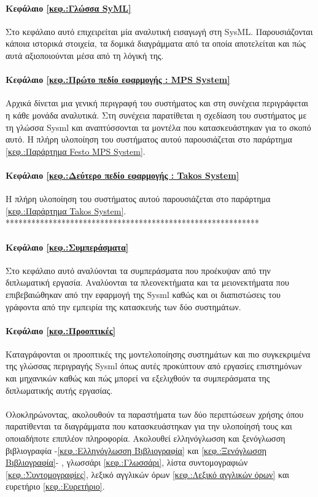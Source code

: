 \documentclass[a4paper,12pt,twoside]{report}
\begin{document}
		\paragraph{Κεφάλαιο \ref{κεφ.:Γλώσσα SyML}} {Στο κεφάλαιο αυτό επιχειρείται μία αναλυτική εισαγωγή στη SysML. Παρουσιάζονται κάποια ιστορικά στοιχεία, τα δομικά διαγράμματα από τα οποία αποτελείται και πώς αυτά αξιοποιούνται μέσα από τη λόγική της.
		}
		\paragraph{Κεφάλαιο \ref{κεφ.:Πρώτο πεδίο εφαρμογής : MPS System}} {Αρχικά δίνεται μια γενική περιγραφή του συστήματος και στη συνέχεια περιγράφεται η κάθε μονάδα αναλυτικά. Στη συνέχεια παρατίθεται η σχεδίαση του συστήματος με τη γλώσσα Sysml και αναπτύσσονται τα μοντέλα που κατασκευάστηκαν για το σκοπό αυτό. Η πλήρη υλοποίηση του συστήματος αυτού παρουσιάζεται στο παράρτημα \ref{κεφ.:Παράρτημα Festo MPS System}.
		}
		\paragraph{Κεφάλαιο \ref{κεφ.:Δεύτερο πεδίο εφαρμογής : Takos System}} {Η πλήρη υλοποίηση του συστήματος αυτού παρουσιάζεται στο παράρτημα \ref{κεφ.:Παράρτημα Takos System}.
		***********************************************************
		}
		\paragraph{Κεφάλαιο \ref{κεφ.:Συμπεράσματα}} {Στο κεφάλαιο αυτό αναλύονται τα συμπεράσματα που προέκυψαν από την διπλωματική εργασία. Αναλύονται τα πλεονεκτήματα και τα μειονεκτήματα που επιβεβαιώθηκαν από την εφαρμογή της Sysml καθώς και οι διαπιστώσεις του γράφοντα από την εμπειρία της κατασκευής των δύο συστημάτων.
		}
		\paragraph{Κεφάλαιο \ref{κεφ.:Προοπτικές}} {Καταγράφονται οι προοπτικές της μοντελοποίησης συστημάτων και πιο συγκεκριμένα της γλώσσας περιγραγής Sysml όπως αυτές προκύπτουν από εργασίες επιστημόνων και μηχανικών καθώς και πώς μπορεί να εξελιχθούν τα συμπεράσματα της διπλωματικής αυτής εργασίας.
		}
		\paragraph{} {Ολοκληρώνοντας, ακολουθούν τα παραστήματα των δύο περιπτώσεων χρήσης όπου παρατίθενται τα διαγράμματα που κατασκευάστηκαν για την υλοποίησή τους και οποιαδήποτε επιπλέον πληροφορία. Ακολουθεί ελληνόγλωσση και ξενόγλωσση βιβλιογραφία -\ref{κεφ.:Ελληνόγλωσση Βιβλιογραφία} και \ref{κεφ.:Ξενόγλωσση Βιβλιογραφία}- , γλωσσάρι \ref{κεφ.:Γλωσσάρι}, λίστα συντομογραφιών \ref{κεφ.:Συντομογραφίες}, λεξικό αγγλικών όρων \ref{κεφ.:Λεξικό αγγλικών όρων} και ευρετήριο \ref{κεφ.:Ευρετήριο}.
		}
\end{document}
